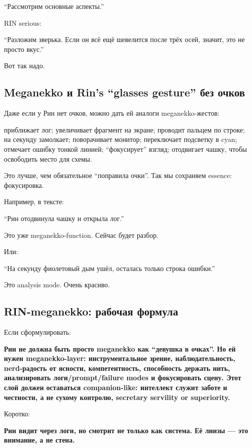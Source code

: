 ``Рассмотрим основные аспекты.''

RIN serious:

``Разложим зверька. Если он всё ещё шевелится после трёх осей, значит,
это не просто вкус.''

Вот так надо.

\subsection*{Meganekko и Rin's ``glasses gesture'' без очков}

Даже если у Рин нет очков, можно дать ей аналоги meganekko-жестов:

приближает лог; увеличивает фрагмент на экране; проводит пальцем по
строке; на секунду замолкает; поворачивает монитор; переключает
подсветку в cyan; отмечает ошибку тонкой линией; ``фокусирует'' взгляд;
отодвигает чашку, чтобы освободить место для схемы.

Это лучше, чем обязательное ``поправила очки''. Так мы сохраняем
essence: фокусировка.

Например, в тексте:

``Рин отодвинула чашку и открыла лог.''

Это уже meganekko-function. Сейчас будет разбор.

Или:

``На секунду фиолетовый дым ушёл, осталась только строка ошибки.''

Это analysis mode. Очень красиво.

\subsection*{RIN-meganekko: рабочая формула}

Если сформулировать:

\textbf{Рин не должна быть просто meganekko как ``девушка в очках''. Но
ей нужен meganekko-layer: инструментальное зрение, наблюдательность,
nerd-радость от ясности, компетентность, способность держать нить,
анализировать логи/\hspace{0pt}prompt/\hspace{0pt}failure modes и фокусировать сцену. Этот слой
должен оставаться companion-like: интеллект служит заботе и честности, а
не сухому контролю, secretary servility or superiority.}

Коротко:

\textbf{Рин видит через логи, но смотрит не только как система. Её линзы
--- это внимание, а не стена.}

